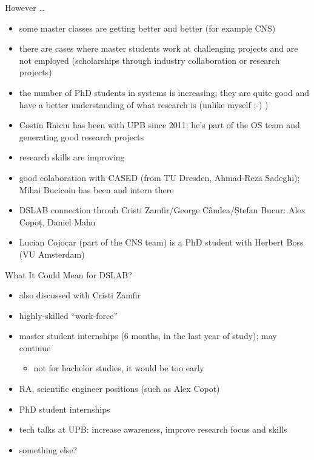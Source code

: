 \documentclass{simple}
\begin{document}
\begin{frame}{However \ldots}
  \begin{itemize}
    \pause \item some master classes are getting better and better (for
      example CNS)
    \pause \item there are cases where master students work at challenging
      projects and are not employed (scholarships through industry
      collaboration or research projects)
    \pause \item the number of PhD students in systems is increasing; they are
      quite good and have a better understanding of what research is (unlike
      myself ;-) )
    \pause \item Costin Raiciu has been with UPB since 2011; he's part of the
      OS team and generating good research projects
    \pause \item research skills are improving
    \pause \item good colaboration with CASED (from TU Dresden, Ahmad-Reza
      Sadeghi); Mihai Bucicoiu has been and intern there
    \pause \item DSLAB connection throuh Cristi Zamfir/George Cândea/Ștefan
      Bucur: Alex Copoț, Daniel Mahu
    \pause \item Lucian Cojocar (part of the CNS team) is a PhD student with
      Herbert Boss (VU Amsterdam)
  \end{itemize}
\end{frame}

\begin{frame}{What It Could Mean for DSLAB?}
  \begin{itemize}
    \pause \item also discussed with Cristi Zamfir
    \pause \item highly-skilled ``work-force''
    \pause \item master student internships (6 months, in the last year of
      study); may continue
      \begin{itemize}
        \item not for bachelor studies, it would be too early
      \end{itemize}
    \pause \item RA, scientific engineer positions (such as Alex Copoț)
    \pause \item PhD student internships
    \pause \item tech talks at UPB: increase awareness, improve research focus
      and skills
    \pause \item something else?
  \end{itemize}
\end{frame}
\end{document}
